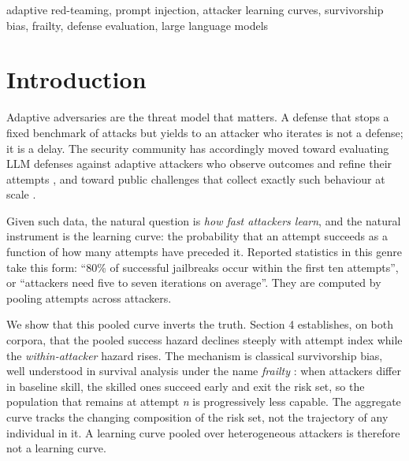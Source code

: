 \documentclass[conference]{IEEEtran}
\begin{document}
\begin{abstract}
and a controlled causal test. The practical consequence is that adaptive red-teaming evaluations built on pooled curves systematically understate attacker learning, and evaluations built on ASR alone cannot see exploit families, the mechanism by which real attackers convert one success into many.
\end{abstract}

\begin{IEEEkeywords}
adaptive red-teaming, prompt injection, attacker learning curves, survivorship bias, frailty, defense evaluation, large language models
\end{IEEEkeywords}


\section{Introduction}

Adaptive adversaries are the threat model that matters. A defense that stops a fixed benchmark of attacks but yields to an attacker who iterates is not a defense; it is a delay. The security community has accordingly moved toward evaluating LLM defenses against adaptive attackers who observe outcomes and refine their attempts \cite{attackerMovesSecond,pismith,gptred}, and toward public challenges that collect exactly such behaviour at scale \cite{llmail,tensortrust}.

Given such data, the natural question is \textit{how fast attackers learn}, and the natural instrument is the learning curve: the probability that an attempt succeeds as a function of how many attempts have preceded it. Reported statistics in this genre take this form: ``80\% of successful jailbreaks occur within the first ten attempts'', or ``attackers need five to seven iterations on average''. They are computed by pooling attempts across attackers.

We show that this pooled curve inverts the truth. Section 4 establishes, on both corpora, that the pooled success hazard declines steeply with attempt index while the \textit{within-attacker} hazard rises. The mechanism is classical survivorship bias, well understood in survival analysis under the name \textit{frailty} \cite{balanputter}: when attackers differ in baseline skill, the skilled ones succeed early and exit the risk set, so the population that remains at attempt \textit{n} is progressively less capable. The aggregate curve tracks the changing composition of the risk set, not the trajectory of any individual in it. A learning curve pooled over heterogeneous attackers is therefore not a learning curve.
\end{document}
